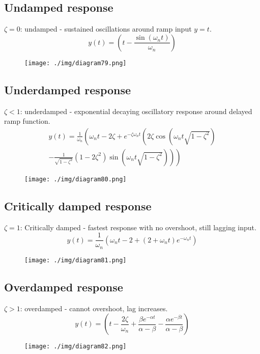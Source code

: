 \subsection{Undamped response}
$\zeta = 0$: undamped - sustained oscillations around ramp input $y = t$.
\begin{equation}
  y(t) = \left(t - \frac{\sin(\omega_n t)}{\omega_n}\right)
\end{equation}
\begin{figure}[H]
  \centering
  \texttt{[image: ./img/diagram79.png]}
\end{figure}
\subsection{Underdamped response}
$\zeta < 1$: underdamped - exponential decaying oscillatory response around delayed ramp function.
\begin{multline}
  y(t) = \frac{1}{\omega_n} \left( \omega_n t - 2\zeta + e^{-\zeta \omega_n t} \left( 2\zeta \cos\left( \omega_n t\sqrt{1 - \zeta^2} \right) \right. \right. \\
  \left. \left. - \frac{1}{\sqrt{1-\zeta^2}} \left( 1 - 2\zeta^2 \right) \sin \left( \omega_n t\sqrt{1-\zeta^2} \right) \right) \right)
\end{multline}
\begin{figure}[H]
  \centering
  \texttt{[image: ./img/diagram80.png]}
\end{figure}
\subsection{Critically damped response}
$\zeta = 1$: Critically damped - fastest response with no overshoot, still lagging input.
\begin{equation}
  y(t) = \frac{1}{\omega_n} \left(\omega_n t - 2 + \left(2 + \omega_n t\right)e^{-\omega_n t}\right)
\end{equation}
\begin{figure}[H]
  \centering
  \texttt{[image: ./img/diagram81.png]}
\end{figure}
\subsection{Overdamped response}
$\zeta > 1$: overdamped - cannot overshoot, lag increases.
\begin{equation}
  y(t) = \left(t -\frac{2\zeta}{\omega_n} + \frac{\beta e^{-\alpha t}}{\alpha - \beta} - \frac{\alpha e^{-\beta t}}{\alpha - \beta} \right)
\end{equation}
\begin{figure}[H]
  \centering
  \texttt{[image: ./img/diagram82.png]}
\end{figure}
